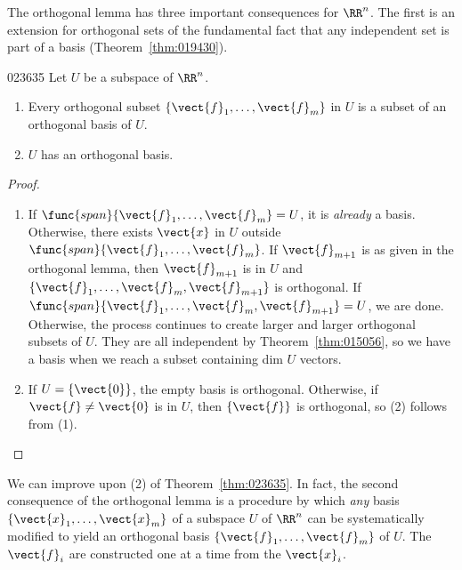The orthogonal lemma has three important consequences for $\RR^n$. The first is an extension for orthogonal sets of the fundamental fact that any independent set is part of a basis (Theorem~\ref{thm:019430}).


\begin{theorem}{}{023635}
Let $U$ be a subspace of $\RR^n$.


\begin{enumerate}
\item Every orthogonal subset $\{\vect{f}_{1}, \dots , \vect{f}_{m}\}$ in $U$ is a subset of an orthogonal basis of $U$.

\item $U$ has an orthogonal basis.

\end{enumerate}
\end{theorem}

\begin{proof}
\begin{enumerate}
\item If $\func{span}\{\vect{f}_{1}, \dots , \vect{f}_{m}\} = U$, it is \textit{already} a basis. Otherwise, there exists $\vect{x}$ in $U$ outside $\func{span}\{\vect{f}_{1}, \dots , \vect{f}_{m}\}$. If $\vect{f}_{m+1}$ is as given in the orthogonal lemma, then $\vect{f}_{m+1}$ is in $U$ and $\{\vect{f}_{1}, \dots , \vect{f}_{m}, \vect{f}_{m+1}\}$ is orthogonal. If $\func{span}\{\vect{f}_{1}, \dots, \vect{f}_{m}, \vect{f}_{m+1}\} = U$, we are done. Otherwise, the process continues to create larger and larger orthogonal subsets of $U$. They are all independent by Theorem~\ref{thm:015056}, so we have a basis when we reach a subset containing dim $U$ vectors.

\item If $U = \{\vect{0}\}$, the empty basis is orthogonal. Otherwise, if $\vect{f} \neq \vect{0}$ is in $U$, then $\{\vect{f}\}$ is orthogonal, so (2) follows from (1).
\end{enumerate}
\vspace*{-2em}\end{proof}

We can improve upon (2) of Theorem~\ref{thm:023635}. In fact, the second consequence of the orthogonal lemma is a procedure by which \textit{any} basis $\{\vect{x}_{1}, \dots , \vect{x}_{m}\}$ of a subspace $U$ of $\RR^n$ can be systematically modified to yield an orthogonal basis $\{\vect{f}_{1}, \dots , \vect{f}_{m}\}$ of $U$. The $\vect{f}_{i}$ are constructed one at a time from the $\vect{x}_{i}$.

